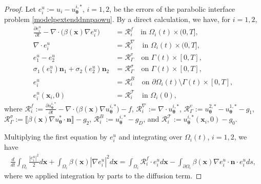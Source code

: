 \documentclass{article}
\newtheorem{proof}{Proof}[section]
\begin{document}
\begin{proof}
Let $e^u_i := u_i - u_{\boldsymbol{\theta}}^{i,*}$, $i = 1, 2$, be the errors of the parabolic interface problem \eqref{modelpextenddnnpaowu}. By a direct calculation, we have, for $i = 1, 2$,
\begin{equation}
\begin{aligned}
\frac{\partial e^u_i}{\partial t} - \nabla \cdot \bigl(\beta(\boldsymbol{x}) \nabla e^u_i\bigr) &= \mathcal{R}^f_i \quad \text{in } \Omega_i(t) \times (0, T], \\
\nabla \cdot e^u_i &= \mathcal{R}^{\nabla}_i \quad \text{in } \Omega_i(t) \times (0, T], \\
e^u_1 - e^u_2 &= \mathcal{R}^v_{\Gamma} \quad \text{on } \Gamma(t) \times [0, T], \\
\sigma_1(e^u_1)\boldsymbol{n}_1 + \sigma_2(e^u_2)\boldsymbol{n}_2 &= \mathcal{R}^{\sigma}_{\Gamma} \quad \text{on } \Gamma(t) \times [0, T], \\
e^u_i &= \mathcal{R}^{B}_i \quad \text{on } \partial\Omega_i(t) \setminus \Gamma(t) \times [0, T], \\
e^u_i(\boldsymbol{x}_i, 0) &= \mathcal{R}^{\mathcal{T}}_i \quad \text{in } \Omega_i(0),
\end{aligned}
\end{equation}
where $\mathcal{R}^f_i := \frac{\partial u_{\boldsymbol{\theta}}^{i,*}}{\partial t} - \nabla \cdot \bigl(\beta(\boldsymbol{x}) \nabla u_{\boldsymbol{\theta}}^{i,*}\bigr) - f$, $\mathcal{R}^{\nabla}_i := \nabla \cdot u_{\boldsymbol{\theta}}^{i,*}$, $\mathcal{R}^v_{\Gamma} := u_{\boldsymbol{\theta}}^{2,*} - u_{\boldsymbol{\theta}}^{1,*} - g_1$, $\mathcal{R}^{\sigma}_{\Gamma} := \llbracket \beta(\boldsymbol{x}) \nabla u_{\boldsymbol{\theta}}^{*} \cdot \boldsymbol{n} \rrbracket - g_2$, $\mathcal{R}^{B}_i := u_{\boldsymbol{\theta}}^{i,*} - g_D$, and $\mathcal{R}^{\mathcal{T}}_i := u_{\boldsymbol{\theta}}^{i,*}(\boldsymbol{x}_i, 0) - g_0$.

Multiplying the first equation by $e^u_i$ and integrating over $\Omega_i(t)$, $i = 1, 2$, we have
\begin{equation}
\begin{aligned}
\frac{d}{dt} \int_{\Omega_i} \frac{|e^u_i|^2}{2} d\boldsymbol{x} + \int_{\Omega_i} \beta(\boldsymbol{x})|\nabla e^u_i|^2 d\boldsymbol{x} = \int_{\Omega_i} \mathcal{R}^f_i \cdot e^u_i d\boldsymbol{x} - \int_{\partial \Omega_i} \beta(\boldsymbol{x}) \nabla e^u_i \cdot \boldsymbol{n} \cdot e^u_i ds,
\end{aligned}
\end{equation}
where we applied integration by parts to the diffusion term. 


\end{proof}
\end{document}

